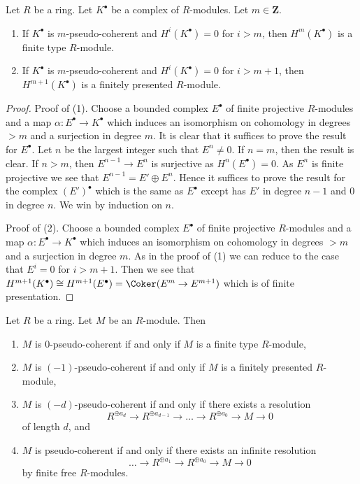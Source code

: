 \begin{lemma}
\label{lemma-finite-cohomology}
Let $R$ be a ring. Let $K^\bullet$ be a complex of $R$-modules.
Let $m \in \mathbf{Z}$.
\begin{enumerate}
\item If $K^\bullet$ is $m$-pseudo-coherent and $H^i(K^\bullet) = 0$
for $i > m$, then $H^m(K^\bullet)$ is a finite type $R$-module.
\item If $K^\bullet$ is $m$-pseudo-coherent and $H^i(K^\bullet) = 0$
for $i > m + 1$, then $H^{m + 1}(K^\bullet)$ is a finitely presented
$R$-module.
\end{enumerate}
\end{lemma}

\begin{proof}
Proof of (1). Choose a bounded complex $E^\bullet$ of finite projective
$R$-modules and a map $\alpha : E^\bullet \to K^\bullet$ which induces
an isomorphism on cohomology in degrees $> m$ and a surjection in degree $m$.
It is clear that it suffices to prove the result for $E^\bullet$.
Let $n$ be the largest integer such that $E^n \not = 0$.
If $n = m$, then the result is clear.
If $n > m$, then $E^{n - 1} \to E^n$ is surjective as
$H^n(E^\bullet) = 0$. As $E^n$ is finite projective we see that
$E^{n - 1} = E' \oplus E^n$. Hence it suffices to prove the result
for the complex $(E')^\bullet$ which is the same as $E^\bullet$
except has $E'$ in degree $n - 1$ and $0$ in degree $n$.
We win by induction on $n$.

\medskip\noindent
Proof of (2). Choose a bounded complex $E^\bullet$ of finite projective
$R$-modules and a map $\alpha : E^\bullet \to K^\bullet$ which induces
an isomorphism on cohomology in degrees $> m$ and a surjection in degree $m$.
As in the proof of (1) we can reduce to the case that $E^i = 0$ for
$i > m + 1$. Then we see that
$H^{m + 1}(K^\bullet) \cong
H^{m + 1}(E^\bullet) = \Coker(E^m \to E^{m + 1})$
which is of finite presentation.
\end{proof}

\begin{lemma}
\label{lemma-n-pseudo-module}
Let $R$ be a ring. Let $M$ be an $R$-module.
Then
\begin{enumerate}
\item $M$ is $0$-pseudo-coherent if and only if $M$ is a finite type
$R$-module,
\item $M$ is $(-1)$-pseudo-coherent if and only if $M$ is a finitely
presented $R$-module,
\item $M$ is $(-d)$-pseudo-coherent if and only if there exists a
resolution
$$
R^{\oplus a_d} \to R^{\oplus a_{d - 1}} \to \ldots \to R^{\oplus a_0} \to
M \to 0
$$
of length $d$, and
\item $M$ is pseudo-coherent if and only if there exists an
infinite resolution
$$
\ldots \to R^{\oplus a_1} \to R^{\oplus a_0} \to M \to 0
$$
by finite free $R$-modules.
\end{enumerate}
\end{lemma}

